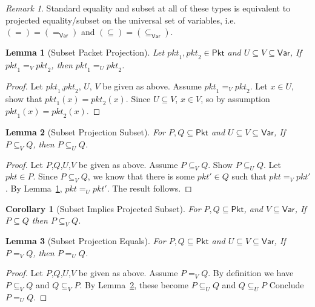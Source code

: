 \documentclass{article}
\newcommand{\pkt}{\mathit{pkt}}
\newcommand{\Pkt}{\mathsf{Pkt}}
\newcommand{\Var}{\mathsf{Var}}
\theoremstyle{plain}
\newtheorem{lemma}{Lemma}
\newtheorem{corollary}{Corollary}
\theoremstyle{definition}
\theoremstyle{remark}
\newtheorem{remark}{Remark}
\begin{document}
\begin{remark}
  Standard equality and subset at all of these types is equivalent to projected
  equality/subset on the universal set of variables, i.e. $(=) = (=_\Var)$ and
  $(\subseteq) = (\subseteq_\Var)$.
\end{remark}

\begin{lemma}[Subset Packet Projection]
  \label{lem:subset-pkt-proj}
 Let $\pkt_1,\pkt_2 \in \Pkt$ and $U \subseteq V \subseteq \Var$,
  If $\pkt_1 =_V \pkt_2$, then $\pkt_1 =_U \pkt_2$.
\end{lemma}
\begin{proof}
  Let $\pkt_1$,$\pkt_2$, $U$, $V$ be given as above. Assume $\pkt_1 =_V \pkt_2$.
  Let $x \in U$, show that $\pkt_1(x) = \pkt_2(x)$. Since $U \subseteq V$, $x
  \in V$, so by assumption $\pkt_1(x) = \pkt_2(x)$.
\end{proof}

\begin{lemma}[Subset Projection Subset]
  \label{lem:subset-proj-subset}
  For $P,Q \subseteq \Pkt$ and $U \subseteq V \subseteq \Var$,
  If $P \subseteq_V Q$, then $P \subseteq_U Q$.
\end{lemma}

\begin{proof}
  Let $P$,$Q$,$U$,$V$ be given as above. Assume $P \subseteq_V Q$. Show $P
  \subseteq_U Q$. Let $\pkt \in P$. Since $P \subseteq_V Q$, we know that there
  is some $\pkt' \in Q$ such that $\pkt =_V \pkt'$. By Lemma~\ref{lem:subset-pkt-proj},
  $\pkt =_U \pkt'$. The result follows.
\end{proof}

\begin{corollary}[Subset Implies Projected Subset]
  \label{cor:subset-proj}
  For $P,Q \subseteq \Pkt$, and $ V \subseteq \Var$,
  If $P \subseteq Q$ then $P \subseteq_V Q$.
\end{corollary}

\begin{lemma}[Subset Projection Equals]
  \label{lem:subset-proj-equals}
  For $P,Q \subseteq \Pkt$ and $U \subseteq V \subseteq \Var$,
  If $P =_V Q$, then $P =_U Q$.
\end{lemma}

\begin{proof}
  Let $P$,$Q$,$U$,$V$ be given as above. Assume $P =_V Q$. By definition we have
  $P \subseteq_V Q$ and $Q \subseteq_V P$. By
  Lemma~\ref{lem:subset-proj-subset}, these become $P \subseteq_U Q$ and $Q\subseteq_U P$
  Conclude $P =_U Q$.
\end{proof}
\end{document}
